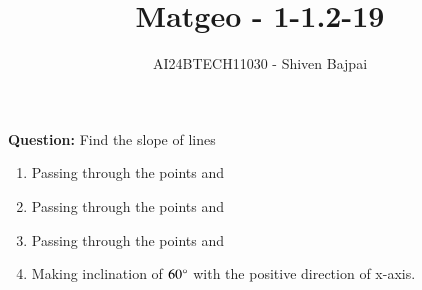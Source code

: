 \documentclass[journal]{IEEEtran}
\begin{document}
\onecolumn

\vspace{3cm}

\renewcommand{\thefigure}{\theenumi}
\renewcommand{\thetable}{\theenumi}

\title{Matgeo - 1-1.2-19}
\author{AI24BTECH11030 - Shiven Bajpai}
\maketitle

\textbf{Question: } Find the slope of lines\\
\begin{enumerate}
	\item{Passing through the points  and }
	\item{Passing through the points  and }
	\item{Passing through the points  and }
	\item{Making inclination of $60\degree$ with the positive direction of x-axis.}
\end{enumerate}
\end{document}
